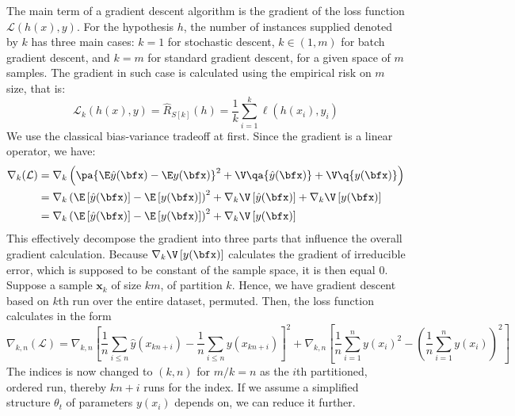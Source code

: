\documentclass[10pt]{article} %
\begin{document}
The main term of a gradient descent algorithm is the gradient of the loss function $\mathcal{L}(h(x),y)$. For the hypothesis $h$, the number of instances supplied denoted by $k$ has three main cases: $k=1$ for stochastic descent, $k\in (1,m)$ for batch gradient descent, and $k=m$ for standard gradient descent, for a given space of $m$ samples. The gradient in such case is calculated using the empirical risk on $m$ size, that is: 
\begin{equation}
    \mathcal{L}_{k}(h(x),y) = \hat{R}_{S[k]}(h) = \frac{1}{k} \sum^{k}_{i=1} \ell(h(x_{i}),y_{i})
\end{equation}
We use the classical bias-variance tradeoff at first. Since the gradient is a linear operator, we have: 
\begin{equation}
    \begin{split}
        \nabla_{k}(\mathcal{L}) &= \nabla_{k}\left(\pa{\E\hat{y}(\bfx) - \E y(\bfx)}^2 + \V\qa{\hat{y}(\bfx)} + \V\q{y(\bfx)}\right)\\
        & = \nabla_{k}\left( \E\left[\hat{y}(\bfx)\right] - \E\left[y(\bfx)\right] \right)^2 + \nabla_{k}\V\left[\hat{y}(\bfx)\right] + \nabla_{k}\V\left[y(\bfx)\right] \\
        & = \nabla_{k}\left( \E\left[\hat{y}(\bfx)\right] - \E\left[y(\bfx)\right] \right)^2 + \nabla_{k}\V\left[y(\bfx)\right]
    \end{split}
\end{equation}
This effectively decompose the gradient into three parts that influence the overall gradient calculation. Because $\nabla_{k}\V\left[y(\bfx)\right]$ calculates the gradient of irreducible error, which is supposed to be constant of the sample space, it is then equal $0$. Suppose a sample $\mathbf{x}_{k}$ of size $km$, of partition $k$. Hence, we have gradient descent based on $k$th run over the entire dataset, permuted. Then, the loss function calculates in the form 
\begin{equation}
  \nabla_{k,n}(\mathcal{L}) = \nabla_{k,n}\left[ \frac{1}{n}\sum_{i\leq n} \hat{y}(x_{kn+i})  - \frac{1}{n}\sum_{i\leq n} y(x_{kn+i}) \right]^{2} + \nabla_{k,n} \left[ \frac{1}{n}\sum_{i=1}^n y(x_i)^2 - \left( \frac{1}{n}\sum_{i=1}^n y(x_i) \right)^2 \right]
\end{equation}
The indices is now changed to $(k,n)$ for $m/k=n$ as the $i$th partitioned, ordered run, thereby $kn+i$ runs for the index. If we assume a simplified structure $\theta_{t}$ of parameters $y(x_{i})$ depends on, we can reduce it further.  
\end{document}

